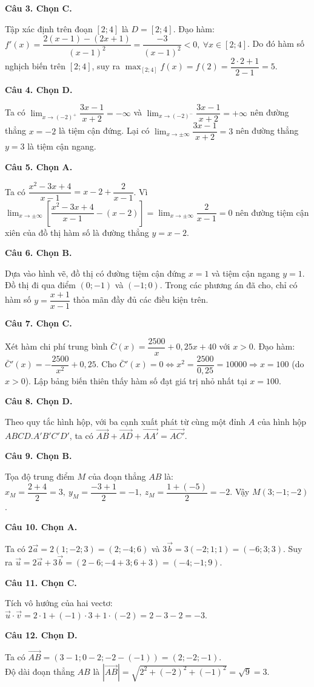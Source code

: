 \documentclass[12pt,a4paper]{article}
\newcommand{\loigiai}[1]{\par\medskip\Needspace{4\baselineskip}\noindent\textbf{#1}\par\nobreak}
\begin{document}
\loigiai{Câu 3. Chọn C.}
Tập xác định trên đoạn $[2;4]$ là $D=[2;4]$.
Đạo hàm: $f'(x)=\dfrac{2(x-1)-(2x+1)}{(x-1)^2}=\dfrac{-3}{(x-1)^2}<0,\ \forall x\in[2;4]$.
Do đó hàm số nghịch biến trên $[2;4]$, suy ra $\max_{[2;4]}f(x)=f(2)=\dfrac{2\cdot 2+1}{2-1}=5$.

\loigiai{Câu 4. Chọn D.}
Ta có $\lim_{x\to (-2)^+}\dfrac{3x-1}{x+2}=-\infty$ và $\lim_{x\to (-2)^-}\dfrac{3x-1}{x+2}=+\infty$ nên đường thẳng $x=-2$ là tiệm cận đứng.
Lại có $\lim_{x\to\pm\infty}\dfrac{3x-1}{x+2}=3$ nên đường thẳng $y=3$ là tiệm cận ngang.

\loigiai{Câu 5. Chọn A.}
Ta có $\dfrac{x^2-3x+4}{x-1}=x-2+\dfrac{2}{x-1}$.
Vì $\lim_{x\to\pm\infty}\left[\dfrac{x^2-3x+4}{x-1}-(x-2)\right]=\lim_{x\to\pm\infty}\dfrac{2}{x-1}=0$ nên đường tiệm cận xiên của đồ thị hàm số là đường thẳng $y=x-2$.

\loigiai{Câu 6. Chọn B.}
Dựa vào hình vẽ, đồ thị có đường tiệm cận đứng $x=1$ và tiệm cận ngang $y=1$.
Đồ thị đi qua điểm $(0;-1)$ và $(-1;0)$.
Trong các phương án đã cho, chỉ có hàm số $y=\dfrac{x+1}{x-1}$ thỏa mãn đầy đủ các điều kiện trên.

\loigiai{Câu 7. Chọn C.}
Xét hàm chi phí trung bình $\bar{C}(x)=\dfrac{2500}{x}+0{,}25x+40$ với $x>0$.
Đạo hàm: $\bar{C}'(x)=-\dfrac{2500}{x^2}+0{,}25$.
Cho $\bar{C}'(x)=0\Leftrightarrow x^2=\dfrac{2500}{0{,}25}=10000\Rightarrow x=100$ (do $x>0$).
Lập bảng biến thiên thấy hàm số đạt giá trị nhỏ nhất tại $x=100$.

\loigiai{Câu 8. Chọn D.}
Theo quy tắc hình hộp, với ba cạnh xuất phát từ cùng một đỉnh $A$ của hình hộp $ABCD.A'B'C'D'$, ta có $\vec{AB}+\vec{AD}+\vec{AA'}=\vec{AC'}$.

\loigiai{Câu 9. Chọn B.}
Tọa độ trung điểm $M$ của đoạn thẳng $AB$ là:
$x_M=\dfrac{2+4}{2}=3,\ y_M=\dfrac{-3+1}{2}=-1,\ z_M=\dfrac{1+(-5)}{2}=-2$.
Vậy $M(3;-1;-2)$.

\loigiai{Câu 10. Chọn A.}
Ta có $2\vec{a}=2(1;-2;3)=(2;-4;6)$ và $3\vec{b}=3(-2;1;1)=(-6;3;3)$.
Suy ra $\vec{u}=2\vec{a}+3\vec{b}=(2-6;-4+3;6+3)=(-4;-1;9)$.

\loigiai{Câu 11. Chọn C.}
Tích vô hướng của hai vectơ:
$\vec{u}\cdot\vec{v}=2\cdot 1+(-1)\cdot 3+1\cdot(-2)=2-3-2=-3$.

\loigiai{Câu 12. Chọn D.}
Ta có $\vec{AB}=(3-1;0-2;-2-(-1))=(2;-2;-1)$.\\
Độ dài đoạn thẳng $AB$ là $|\vec{AB}|=\sqrt{2^2+(-2)^2+(-1)^2}=\sqrt{9}=3$.

\newpage
\end{document}
